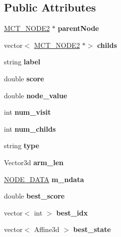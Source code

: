 \subsection*{Public Attributes}
\begin{DoxyCompactItemize}
\item 
\mbox{\label{classMCT__NODE2_a9a39405216826460e11b0865556ee0db}} 
\hyperlink{classMCT__NODE2}{M\+C\+T\+\_\+\+N\+O\+D\+E2} $\ast$ {\bfseries parent\+Node}
\item 
\mbox{\label{classMCT__NODE2_aa60c90f3cbbcd3e355d7de9675048e7a}} 
vector$<$ \hyperlink{classMCT__NODE2}{M\+C\+T\+\_\+\+N\+O\+D\+E2} $\ast$$>$ {\bfseries childs}
\item 
\mbox{\label{classMCT__NODE2_a0e77e9354445bfc3609d50687179c76a}} 
string {\bfseries label}
\item 
\mbox{\label{classMCT__NODE2_a0e7e94393ff13d35c204f0008f194b21}} 
double {\bfseries score}
\item 
\mbox{\label{classMCT__NODE2_aea3632ed0982534dee1f4a60d56c3f21}} 
double {\bfseries node\+\_\+value}
\item 
\mbox{\label{classMCT__NODE2_a613a6cf94f700df93f2d17d75cef5551}} 
int {\bfseries num\+\_\+visit}
\item 
\mbox{\label{classMCT__NODE2_a287d39d9355208167d8af1859844d0bf}} 
int {\bfseries num\+\_\+childs}
\item 
\mbox{\label{classMCT__NODE2_aa1e45aad90bb598289fb34c4da3971a0}} 
string {\bfseries type}
\item 
\mbox{\label{classMCT__NODE2_af82fcb1cce3a71b11d5d4f7309fa4ea9}} 
Vector3d {\bfseries arm\+\_\+len}
\item 
\mbox{\label{classMCT__NODE2_a30bd8b8058d5480cf5adfe53e621e0f5}} 
\hyperlink{structNODE__DATA}{N\+O\+D\+E\+\_\+\+D\+A\+TA} {\bfseries m\+\_\+ndata}
\item 
\mbox{\label{classMCT__NODE2_aaeabafd0d4bd2e7ed2304cfad542937e}} 
double {\bfseries best\+\_\+score}
\item 
\mbox{\label{classMCT__NODE2_a4169d8ff91cf7cd1e83e3899bcead531}} 
vector$<$ int $>$ {\bfseries best\+\_\+idx}
\item 
\mbox{\label{classMCT__NODE2_a786433c1043c2f6659e69893e66d4bc7}} 
vector$<$ Affine3d $>$ {\bfseries best\+\_\+state}
\end{DoxyCompactItemize}
